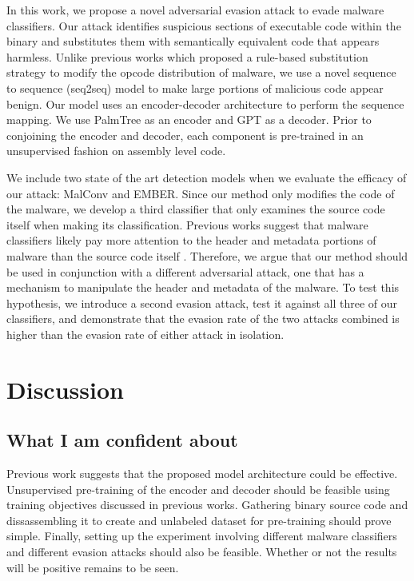 \documentclass[conference]{IEEEtran}
\begin{document}
In this work, we propose a novel adversarial evasion attack to evade malware classifiers. Our attack identifies suspicious sections of executable code within the binary and substitutes them with semantically equivalent code that appears harmless. Unlike previous works which proposed a rule-based substitution strategy to modify the opcode distribution of malware, we use a novel sequence to sequence (seq2seq) model to make large portions of malicious code appear benign. Our model uses an encoder-decoder architecture to perform the sequence mapping. We use PalmTree as an encoder and GPT as a decoder. Prior to conjoining the encoder and decoder, each component is pre-trained in an unsupervised fashion on assembly level code. 

We include two state of the art detection models when we evaluate the efficacy of our attack: MalConv and EMBER. Since our method only modifies the code of the malware, we develop a third classifier that only examines the source code itself when making its classification. Previous works suggest that malware classifiers likely pay more attention to the header and metadata portions of malware than the source code itself \cite{}. Therefore, we argue that our method should be used in conjunction with a different adversarial attack, one that has a mechanism to manipulate the header and metadata of the malware. To test this hypothesis, we introduce a second evasion attack, test it against all three of our classifiers, and demonstrate that the evasion rate of the two attacks combined is higher than the evasion rate of either attack in isolation.


\section{Discussion}
\label{sec:Discussion}


\subsection{What I am confident about}

Previous work suggests that the proposed model architecture could be effective. Unsupervised pre-training of the encoder and decoder should be feasible using training objectives discussed in previous works. Gathering binary source code and dissassembling it to create and unlabeled dataset for pre-training should prove simple. Finally, setting up the experiment involving different malware classifiers and different evasion attacks should also be feasible. Whether or not the results will be positive remains to be seen.
\end{document}
